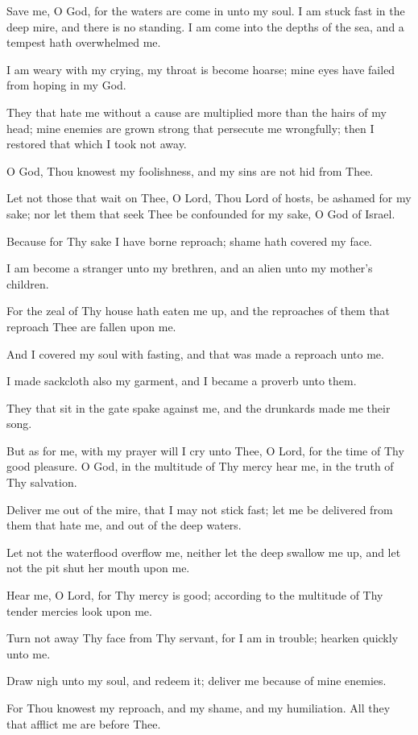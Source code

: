 Save me, O God, for the waters are come in unto my soul. I am stuck fast in the deep mire, and there is no standing. I am come into the depths of the sea, and a tempest hath overwhelmed me.

I am weary with my crying, my throat is become hoarse; mine eyes have failed from hoping in my God.

They that hate me without a cause are multiplied more than the hairs of my head; mine enemies are grown strong that persecute me wrongfully; then I restored that which I took not away.

O God, Thou knowest my foolishness, and my sins are not hid from Thee.

Let not those that wait on Thee, O Lord, Thou Lord of hosts, be ashamed for my sake; nor let them that seek Thee be confounded for my sake, O God of Israel.

Because for Thy sake I have borne reproach; shame hath covered my face.

I am become a stranger unto my brethren, and an alien unto my mother's children.

For the zeal of Thy house hath eaten me up, and the reproaches of them that reproach Thee are fallen upon me.

And I covered my soul with fasting, and that was made a reproach unto me.

I made sackcloth also my garment, and I became a proverb unto them.

They that sit in the gate spake against me, and the drunkards made me their song.

But as for me, with my prayer will I cry unto Thee, O Lord, for the time of Thy good pleasure. O God, in the multitude of Thy mercy hear me, in the truth of Thy salvation.

Deliver me out of the mire, that I may not stick fast; let me be delivered from them that hate me, and out of the deep waters.

Let not the waterflood overflow me, neither let the deep swallow me up, and let not the pit shut her mouth upon me.

Hear me, O Lord, for Thy mercy is good; according to the multitude of Thy tender mercies look upon me.

Turn not away Thy face from Thy servant, for I am in trouble; hearken quickly unto me.

Draw nigh unto my soul, and redeem it; deliver me because of mine enemies.

For Thou knowest my reproach, and my shame, and my humiliation. All they that afflict me are before Thee.

